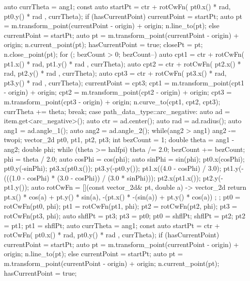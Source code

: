\begin{codeblock}
{{{    auto currTheta = ang1;
    const auto startPt =
      ctr + rotCwFn({ pt0.x() * rad, pt0.y() * rad }, currTheta);
    if (hasCurrentPoint) {
      currentPoint = startPt;
      auto pt = m.transform_point(currentPoint - origin) + origin;
      n.line_to(pt);
    }
    else {
      currentPoint = startPt;
      auto pt = m.transform_point(currentPoint - origin) + origin;
      n.current_point(pt);
      hasCurrentPoint = true;
      closePt = pt;
      n.close_point(pt);
    }
    for (; bezCount > 0; bezCount--) {
      auto cpt1 = ctr + rotCwFn({ pt1.x() * rad, pt1.y() * rad }, currTheta);
      auto cpt2 = ctr + rotCwFn({ pt2.x() * rad, pt2.y() * rad }, currTheta);
      auto cpt3 = ctr + rotCwFn({ pt3.x() * rad, pt3.y() * rad }, currTheta);
      currentPoint = cpt3;
      cpt1 = m.transform_point(cpt1 - origin) + origin;
      cpt2 = m.transform_point(cpt2 - origin) + origin;
      cpt3 = m.transform_point(cpt3 - origin) + origin;
      n.curve_to(cpt1, cpt2, cpt3);
      currTheta += theta;
    }
  } break;
  case path_data_type::arc_negative:
  {
    auto ad = item.get<arc_negative>();
    auto ctr = ad.center();
    auto rad = ad.radius();
    auto ang1 = ad.angle_1();
    auto ang2 = ad.angle_2();
    while(ang2 > ang1) {
      ang2 -= twopi;
    }
    vector_2d pt0, pt1, pt2, pt3;
    int bezCount = 1;
    double theta = ang1 - ang2;
    double phi;
    while (theta >= halfpi) {
      theta /= 2.0;
      bezCount += bezCount;
    }
    phi = theta / 2.0;
    auto cosPhi = cos(phi);
    auto sinPhi = sin(phi);
    pt0.x(cosPhi);
    pt0.y(-sinPhi);
    pt3.x(pt0.x());
    pt3.y(-pt0.y());
    pt1.x((4.0 - cosPhi) / 3.0);
    pt1.y(-(((1.0 - cosPhi) * (3.0 - cosPhi)) / (3.0 * sinPhi)));
    pt2.x(pt1.x());
    pt2.y(-pt1.y());
    auto rotCwFn = [](const vector_2d& pt, double a) -> vector_2d {
      return { pt.x() * cos(a) + pt.y() * sin(a),
        -(pt.x() * -(sin(a)) + pt.y() * cos(a)) };
    };
    pt0 = rotCwFn(pt0, phi);
    pt1 = rotCwFn(pt1, phi);
    pt2 = rotCwFn(pt2, phi);
    pt3 = rotCwFn(pt3, phi);
    auto shflPt = pt3;
    pt3 = pt0;
    pt0 = shflPt;
    shflPt = pt2;
    pt2 = pt1;
    pt1 = shflPt;
    auto currTheta = ang1;
    const auto startPt =
      ctr + rotCwFn({ pt0.x() * rad, pt0.y() * rad }, currTheta);
    if (hasCurrentPoint) {
      currentPoint = startPt;
      auto pt = m.transform_point(currentPoint - origin) + origin;
      n.line_to(pt);
    }
    else {
      currentPoint = startPt;
      auto pt = m.transform_point(currentPoint - origin) + origin;
      n.current_point(pt);
      hasCurrentPoint = true;
}}}}
\end{codeblock}
